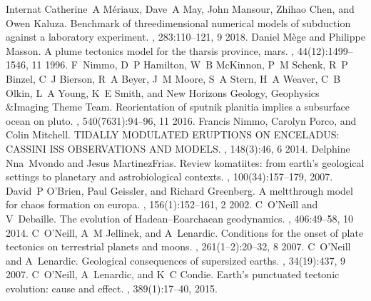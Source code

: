 \documentclass[letterpaper,10pt,english]{jupyterBook}
\begin{document}
\begin{sphinxthebibliography}{Internat}
\sphinxAtStartPar
Catherine A Mériaux, Dave A May, John Mansour, Zhihao Chen, and Owen Kaluza. Benchmark of three\sphinxhyphen{}dimensional numerical models of subduction against a laboratory experiment. , 283:110–121, 9 2018.
\sphinxAtStartPar
Daniel Mège and Philippe Masson. A plume tectonics model for the tharsis province, mars. , 44(12):1499–1546, 11 1996.
\sphinxAtStartPar
F Nimmo, D P Hamilton, W B McKinnon, P M Schenk, R P Binzel, C J Bierson, R A Beyer, J M Moore, S A Stern, H A Weaver, C B Olkin, L A Young, K E Smith, and New Horizons Geology, Geophysics \&Imaging Theme Team. Reorientation of sputnik planitia implies a subsurface ocean on pluto. , 540(7631):94–96, 11 2016.
\sphinxAtStartPar
Francis Nimmo, Carolyn Porco, and Colin Mitchell. TIDALLY MODULATED ERUPTIONS ON ENCELADUS: CASSINI ISS OBSERVATIONS AND MODELS. , 148(3):46, 6 2014.
\sphinxAtStartPar
Delphine Nna Mvondo and Jesus Martinez\sphinxhyphen{}Frias. Review komatiites: from earth's geological settings to planetary and astrobiological contexts. , 100(3\sphinxhyphen{}4):157–179, 2007.
\sphinxAtStartPar
David P O'Brien, Paul Geissler, and Richard Greenberg. A melt\sphinxhyphen{}through model for chaos formation on europa. , 156(1):152–161, 2 2002.
\sphinxAtStartPar
C O'Neill and V Debaille. The evolution of Hadean–Eoarchaean geodynamics. , 406:49–58, 10 2014.
\sphinxAtStartPar
C O'Neill, A M Jellinek, and A Lenardic. Conditions for the onset of plate tectonics on terrestrial planets and moons. , 261(1–2):20–32, 8 2007.
\sphinxAtStartPar
C O'Neill and A Lenardic. Geological consequences of super\sphinxhyphen{}sized earths. , 34(19):437, 9 2007.
\sphinxAtStartPar
C O'Neill, A Lenardic, and K C Condie. Earth's punctuated tectonic evolution: cause and effect. , 389(1):17–40, 2015.

\end{sphinxthebibliography}
\end{document}
